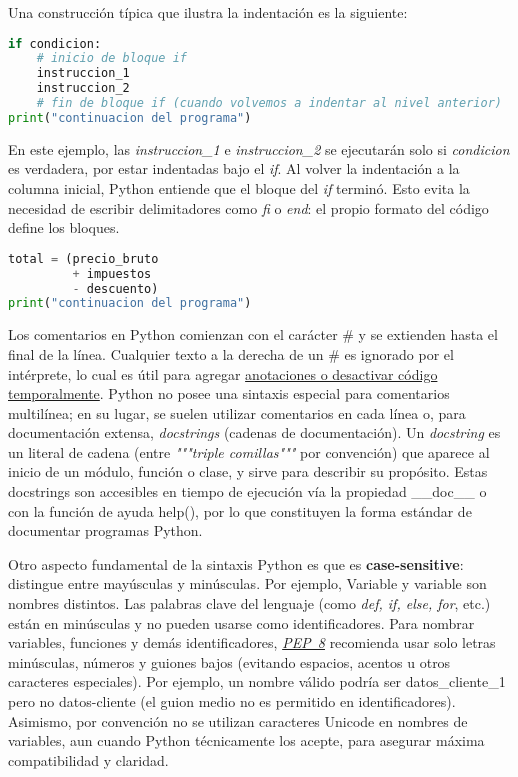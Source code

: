 Una construcción típica que ilustra la indentación es la siguiente:

\begin{lstlisting}[language=Python, caption={Estructura de if en Python.}]
if condicion:
    # inicio de bloque if
    instruccion_1
    instruccion_2
    # fin de bloque if (cuando volvemos a indentar al nivel anterior)
print("continuacion del programa")
\end{lstlisting}

En este ejemplo, las \textit{instruccion\_1} e \textit{instruccion\_2} se ejecutarán solo si 
\textit{condicion} es verdadera, por estar indentadas bajo el \textit{if}. 
Al volver la indentación a la columna inicial, Python entiende que el bloque del \textit{if} terminó. 
Esto evita la necesidad de escribir delimitadores como \textit{fi} o \textit{end}: 
el propio formato del código define los bloques.

\begin{lstlisting}[language=Python, caption={Expresión multilínea en Python.}]
total = (precio_bruto 
         + impuestos 
         - descuento)
print("continuacion del programa")
\end{lstlisting}

Los comentarios en Python comienzan con el carácter \# y se extienden hasta el final de la línea. 
Cualquier texto a la derecha de un \# es ignorado por el intérprete, lo cual es útil para agregar 
\href{https://docs.python.org/3/tutorial/introduction.html\#using-python-as-a-calculator}{anotaciones o desactivar código temporalmente}. 
Python no posee una sintaxis especial para comentarios multilínea; en su lugar, se suelen utilizar 
comentarios en cada línea o, para documentación extensa, \textit{docstrings} (cadenas de documentación). 
Un \textit{docstring} es un literal de cadena (entre \textit{"""triple comillas"""} por convención)
que aparece al inicio de un módulo, función o clase, y sirve para describir su propósito.
Estas docstrings son accesibles en tiempo de ejecución vía la propiedad \_\_doc\_\_ o con la función
de ayuda help(), por lo que constituyen la forma estándar de documentar programas Python.

Otro aspecto fundamental de la sintaxis Python es que es \textbf{case-sensitive}: distingue entre 
mayúsculas y minúsculas. Por ejemplo, Variable y variable son nombres distintos. Las palabras clave 
del lenguaje (como \textit{def, if, else, for}, etc.) están en minúsculas y no pueden usarse como 
identificadores. Para nombrar variables, funciones y demás identificadores, \href{https://peps.python.org/pep-0008/#:~:text=Function%20names%20should%20be%20lowercase%2C,as%20necessary%20to%20improve%20readability}{\textit{PEP 8}} 
recomienda usar solo letras minúsculas, números y guiones bajos (evitando espacios, acentos 
u otros caracteres especiales). Por ejemplo, un nombre válido podría ser datos\_cliente\_1 pero no 
datos-cliente (el guion medio no es permitido en identificadores). Asimismo, por convención no 
se utilizan caracteres Unicode en nombres de variables, aun cuando Python técnicamente los acepte, 
para asegurar máxima compatibilidad y claridad.


